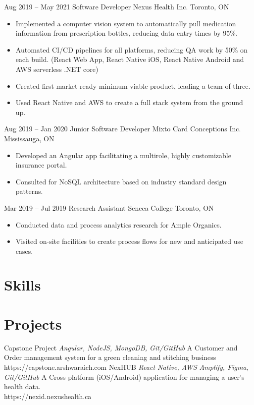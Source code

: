 \documentclass[letterpaper]{moderncv}
\begin{document}
\cventry
{Aug 2019 -- May 2021}
{Software Developer}
{Nexus Health Inc.}
{Toronto, ON}
{}
{\begin{itemize}%
    \item Implemented a computer vision system to automatically pull medication information from prescription bottles, reducing data entry times by 95\%.
    \item Automated CI/CD pipelines for all platforms, reducing QA work by 50\% on each build. (React Web App, React Native iOS, React Native Android and AWS serverless .NET core)
	\item Created first market ready minimum viable product, leading a team of three.
	\item Used React Native and AWS to create a full stack system from the ground up.
	\end{itemize}}
\cventry
{Aug 2019 -- Jan 2020}
{Junior Software Developer}
{Mixto Card Conceptions Inc.}
{Mississauga, ON}
{}
{\begin{itemize}%
	\item Developed an Angular app facilitating a multirole, highly customizable insurance portal.
	\item Consulted for NoSQL architecture based on industry standard design patterns.
	\end{itemize}}
\cventry
{Mar 2019 -- Jul 2019}
{Research Assistant}
{Seneca College}
{Toronto, ON}
{}
{\begin{itemize}%
	\item Conducted data and process analytics research for Ample Organics.
	\item Visited on-site facilities to create process flows for new and anticipated use cases.
	\end{itemize}}
\section{Skills}
\section{Projects}
\cventry
{}
{Capstone Project}
{}
{\textit{Angular, NodeJS, MongoDB, Git/GitHub}}
{}
{A Customer and Order management system for a green cleaning and stitching business\\https://capstone.arshwaraich.com}
\vspace{1mm}
\cventry
{}
{NexHUB}
{}
{\textit{React Native, AWS Amplify, Figma, Git/GitHub}}
{}
{A Cross platform (iOS/Android) application for managing a user's health data.\\https://nexid.nexushealth.ca}
\vspace{1mm}
\end{document}
